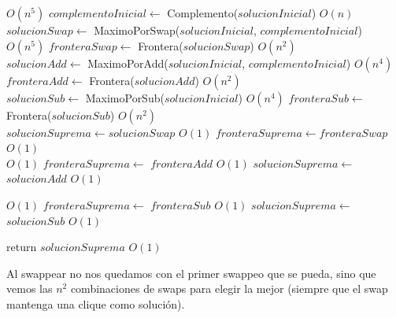 \begin{algorithm}[H]
\begin{algorithmic}
             \Comment $O(n^5)$
    \State $complementoInicial \gets$ Complemento($solucionInicial$) \Comment $O(n)$\\

    \State $solucionSwap \gets$ MaximoPorSwap($solucionInicial$, $complementoInicial$)  \Comment $O(n^5)$
    \State $fronteraSwap \gets$ Frontera($solucionSwap$)                                \Comment $O(n^2)$ \\

    \State $solucionAdd \gets$ MaximoPorAdd($solucionInicial$, $complementoInicial$)    \Comment $O(n^4)$
    \State $fronteraAdd \gets$ Frontera($solucionAdd$)                                  \Comment $O(n^2)$\\

    \State $solucionSub \gets$ MaximoPorSub($solucionInicial$)      \Comment $O(n^4)$
    \State $fronteraSub \gets$ Frontera($solucionSub$)              \Comment $O(n^2)$\\

    \State $solucionSuprema \gets solucionSwap$ \Comment $O(1)$
    \State $fronteraSuprema \gets fronteraSwap$ \Comment $O(1)$\\

                    \Comment $O(1)$
        \State $fronteraSuprema \gets$ $fronteraAdd$    \Comment $O(1)$
        \State $solucionSuprema \gets$ $solucionAdd$    \Comment $O(1)$\\
    \EndIf

                    \Comment $O(1)$
        \State $fronteraSuprema \gets$ $fronteraSub$    \Comment $O(1)$
        \State $solucionSuprema \gets$ $solucionSub$    \Comment $O(1)$\\
    \EndIf

    \State return $solucionSuprema$                     \Comment $O(1)$
\EndFunction

\end{algorithmic}
\end{algorithm}

Al swappear no nos quedamos con el primer swappeo que se pueda, sino que vemos las $n^2$ combinaciones de swaps para elegir la mejor (siempre que el swap mantenga una clique como solución).

